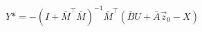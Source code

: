 \documentclass{article}
\begin{document}
\thispagestyle{empty}

$$
Y* = -(I + \bar{M}^\top\bar{M})^{-1}\bar{M}^\top(\bar{B} U + \bar{A}\vec{z}_0 - X)
$$
\end{document}
